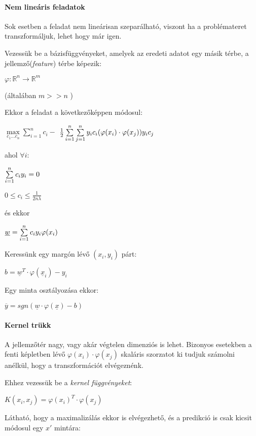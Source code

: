 \paragraph{Nem lineáris feladatok} 


Sok esetben a feladat nem lineárisan szeparálható, viszont ha a problémateret
transzformáljuk, lehet hogy már igen. 

Vezessük be a bázisfüggvényeket, amelyek az eredeti adatot egy másik térbe,
a jellemző(\textit{feature}) térbe képezik:


$ \varphi : \mathbb{R}^n \rightarrow \mathbb{R}^m $

(általában $ m >> n $ )


\noindent
Ekkor a feladat a következőképpen módosul:

$ \max\limits_{c_1 \dots c_n} \sum\limits_{i=1}^{n}c_i -  $
$ \frac{1}{2}\sum\limits_{{i}=1}^{n}\sum\limits_{{j}=1}^{n} y_i c_i (\varphi(x_i) \cdot \varphi(x_j)) y_i c_j $

\noindent
ahol $ \forall i: $

$  \sum\limits_{{i}=1}^{n} c_i y_i = 0 $

$ 0 \leq c_i \leq \frac{1}{2n\lambda} $

\noindent
és ekkor

$ \underline{w} = \sum\limits_{{i}=1}^{n} c_i y_i \varphi(x_i) $

\noindent
Keressünk egy margón lévő $ (x_i, y_i) $ párt:

$ b = \underline{w}^T \cdot \varphi(\underline{x}_i)  - y_i$


\noindent
Egy minta osztályozása ekkor:

$ \overline{y} = sgn(\underline{w} \cdot \varphi(\underline{x}) - b) $


\paragraph{Kernel trükk} 

A jellemzőtér nagy, vagy akár végtelen dimenziós is lehet. Bizonyos esetekben a fenti képletben lévő
$ \varphi(x_i) \cdot \varphi(x_j) $ skaláris szorzatot ki tudjuk számolni anélkül, hogy a transzformációt 
elvégeznénk.



\noindent
Ehhez vezessük be a \textit{kernel függvényeket}:

$ K(x_i, x_j) = \varphi(x_i)^T \cdot \varphi(x_j) $

\noindent
Látható, hogy a maximalizálás ekkor is elvégezhető, és a predikció is csak kicsit módosul
egy $ x' $ mintára:

